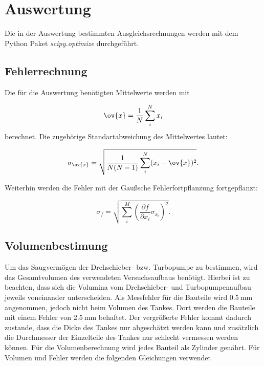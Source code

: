 \section{Auswertung}

Die in der Auswertung bestimmten Ausgleichsrechnungen werden mit
dem Python Paket \emph{scipy.optimize}\cite{scipy} durchgeführt.

\subsection{Fehlerrechnung}

Die für die Auswertung benötigten Mittelwerte werden mit

\begin{equation}
  \label{eq: mittel}
  \ov{x}=\frac{1}{N}\sum_i^N x_i
\end{equation}
berechnet. Die zugehörige Standartabweichung des Mittelwertes lautet: %

\begin{equation}
  \label{eq: standartabweichung}
  \sigma_{\ov{x}}=\sqrt{ \frac{1}{N(N-1)} \sum_i^N (x_i-\ov{x})^2}.
\end{equation}

Weiterhin werden die Fehler mit der Gaußsche Fehlerfortpflanzung fortgepflanzt: %

\begin{equation}
  \label{eq: gauss_fehler}
  \sigma_f= \sqrt{ \sum_i^M \left(\frac{\partial f}{\partial x_i} \sigma_{x_i}\right)^2}.
\end{equation}

\subsection{Volumenbestimung} %

Um das Saugvermögen der Drehschieber- bzw. Turbopumpe zu bestimmen, wird das Gesamtvolumen des verwendeten Versuchsaufbaus benötigt. %
Hierbei ist zu beachten, dass sich die Volumina vom Drehschieber- und Turbopumpenaufbau jeweils voneinander unterscheiden.
Als Messfehler für die Bauteile wird $\SI{0.5}{\milli\meter}$ angenommen, jedoch nicht beim Volumen des Tankes. Dort werden die
Bauteile mit einem Fehler von $\SI{2.5}{\milli\meter}$ behaftet. Der vergrößerte Fehler kommt dadurch zustande, dass die
Dicke des Tankes nur abgeschätzt werden kann und zusätzlich die Durchmesser der Einzelteile des Tankes nur schlecht vermessen werden können.
Für die Volumenberechnung wird jedes Bauteil als Zylinder genährt. Für Volumen und Fehler werden die folgenden Gleichungen verwendet %

